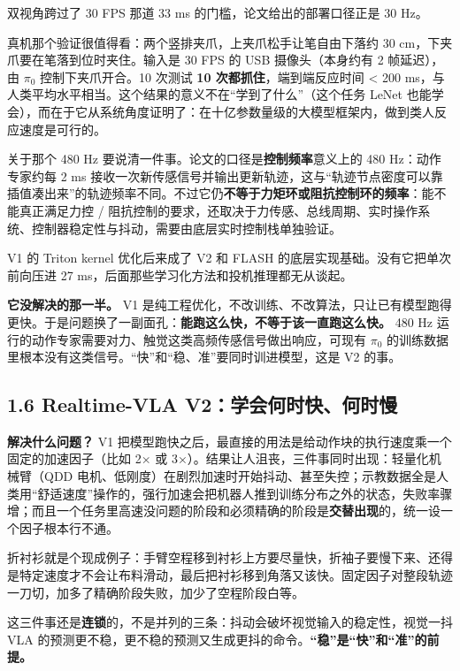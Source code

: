 \documentclass[
  chinese,
]{ctexart}
\begin{document}
双视角跨过了 30 FPS 那道 33 ms 的门槛，论文给出的部署口径正是 30 Hz。

真机那个验证很值得看：两个竖排夹爪，上夹爪松手让笔自由下落约 30
cm，下夹爪要在笔落到位时夹住。输入是 30 FPS 的 USB 摄像头（本身约有 2
帧延迟），由 \(\pi_0\) 控制下夹爪开合。10 次测试 \textbf{10
次都抓住}，端到端反应时间 \textless{} 200
ms，与人类平均水平相当。这个结果的意义不在``学到了什么''（这个任务 LeNet
也能学会），而在于它从系统角度证明了：在十亿参数量级的大模型框架内，做到类人反应速度是可行的。

关于那个 480 Hz 要说清一件事。论文的口径是\textbf{控制频率}意义上的 480
Hz：动作专家约每 2 ms
接收一次新传感信号并输出更新轨迹，这与``轨迹节点密度可以靠插值凑出来''的轨迹频率不同。不过它仍\textbf{不等于力矩环或阻抗控制环的频率}：能不能真正满足力控
/
阻抗控制的要求，还取决于力传感、总线周期、实时操作系统、控制器稳定性与抖动，需要由底层实时控制栈单独验证。

V1 的 Triton kernel 优化后来成了 V2 和 FLASH
的底层实现基础。没有它把单次前向压进 27
ms，后面那些学习化方法和投机推理都无从谈起。

\textbf{它没解决的那一半。} V1
是纯工程优化，不改训练、不改算法，只让已有模型跑得更快。于是问题换了一副面孔：\textbf{能跑这么快，不等于该一直跑这么快。}
480 Hz 运行的动作专家需要对力、触觉这类高频传感信号做出响应，可现有
\(\pi_0\)
的训练数据里根本没有这类信号。``快''和``稳、准''要同时训进模型，这是 V2
的事。

\subsection{1.6 Realtime-VLA
V2：学会何时快、何时慢}\label{realtime-vla-v2ux5b66ux4f1aux4f55ux65f6ux5febux4f55ux65f6ux6162}

\textbf{解决什么问题？} V1
把模型跑快之后，最直接的用法是给动作块的执行速度乘一个固定的加速因子（比如
2× 或 3×）。结果让人沮丧，三件事同时出现：轻量化机械臂（QDD
电机、低刚度）在剧烈加速时开始抖动、甚至失控；示教数据全是人类用``舒适速度''操作的，强行加速会把机器人推到训练分布之外的状态，失败率骤增；而且一个任务里高速没问题的阶段和必须精确的阶段是\textbf{交替出现}的，统一设一个因子根本行不通。

折衬衫就是个现成例子：手臂空程移到衬衫上方要尽量快，折袖子要慢下来、还得是特定速度才不会让布料滑动，最后把衬衫移到角落又该快。固定因子对整段轨迹一刀切，加多了精确阶段失败，加少了空程阶段白等。

这三件事还是\textbf{连锁}的，不是并列的三条：抖动会破坏视觉输入的稳定性，视觉一抖
VLA
的预测更不稳，更不稳的预测又生成更抖的命令。\textbf{``稳''是``快''和``准''的前提。}
\end{document}

